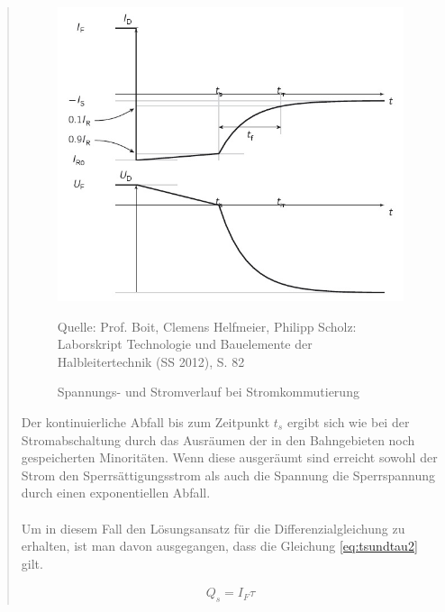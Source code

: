 \begin{quote}
	\begin{figure}[H]
        \centering
        \includegraphics[scale=0.7]{./SchaltverhaltenBilder/Stromkommutierung.jpg}
        \caption{Spannungs- und Stromverlauf bei Stromkommutierung}
             \begin{center}
                 \small Quelle: Prof. Boit, Clemens Helfmeier, Philipp Scholz: Laborskript Technologie und Bauelemente der Halbleitertechnik (SS 2012), S. 82
             \end{center}
        \label{fig:kommverlauf}
    \end{figure}

	\vspace{2em}

	Der kontinuierliche Abfall bis zum Zeitpunkt $t_s$ ergibt sich wie bei der
	Stromabschaltung durch das Ausräumen der in den Bahngebieten noch
	gespeicherten Minoritäten. Wenn diese ausgeräumt sind erreicht sowohl der
	Strom den Sperrsättigungsstrom als auch die Spannung die Sperrspannung durch
	einen exponentiellen Abfall.\\
	\\
	Um in diesem Fall den Lösungsansatz für die Differenzialgleichung zu
	erhalten, ist man davon ausgegangen, dass die Gleichung \ref{eq:tsundtau2}
	gilt.

	\begin{equation}
         \begin{split}
             Q_{s}=I_{F}\tau
             \end{split}
         \label{eq:tsundtau2}
    \end{equation}


\end{quote}
